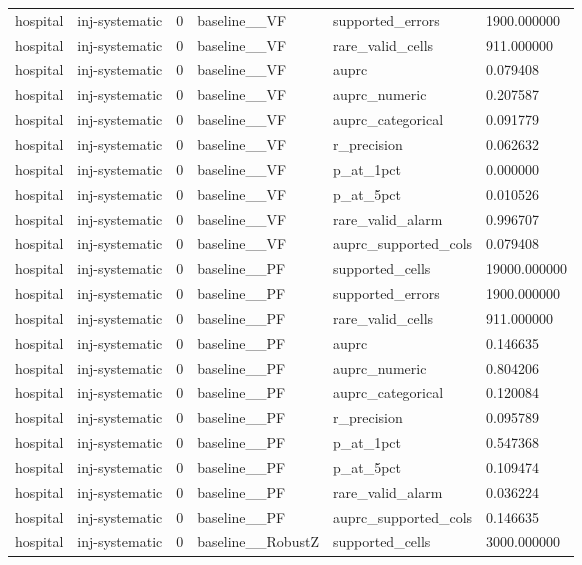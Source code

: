 \begin{tabular}{llllll}
hospital & inj-systematic & 0 & baseline\_\_VF & supported\_errors & 1900.000000 \\
hospital & inj-systematic & 0 & baseline\_\_VF & rare\_valid\_cells & 911.000000 \\
hospital & inj-systematic & 0 & baseline\_\_VF & auprc & 0.079408 \\
hospital & inj-systematic & 0 & baseline\_\_VF & auprc\_numeric & 0.207587 \\
hospital & inj-systematic & 0 & baseline\_\_VF & auprc\_categorical & 0.091779 \\
hospital & inj-systematic & 0 & baseline\_\_VF & r\_precision & 0.062632 \\
hospital & inj-systematic & 0 & baseline\_\_VF & p\_at\_1pct & 0.000000 \\
hospital & inj-systematic & 0 & baseline\_\_VF & p\_at\_5pct & 0.010526 \\
hospital & inj-systematic & 0 & baseline\_\_VF & rare\_valid\_alarm & 0.996707 \\
hospital & inj-systematic & 0 & baseline\_\_VF & auprc\_supported\_cols & 0.079408 \\
hospital & inj-systematic & 0 & baseline\_\_PF & supported\_cells & 19000.000000 \\
hospital & inj-systematic & 0 & baseline\_\_PF & supported\_errors & 1900.000000 \\
hospital & inj-systematic & 0 & baseline\_\_PF & rare\_valid\_cells & 911.000000 \\
hospital & inj-systematic & 0 & baseline\_\_PF & auprc & 0.146635 \\
hospital & inj-systematic & 0 & baseline\_\_PF & auprc\_numeric & 0.804206 \\
hospital & inj-systematic & 0 & baseline\_\_PF & auprc\_categorical & 0.120084 \\
hospital & inj-systematic & 0 & baseline\_\_PF & r\_precision & 0.095789 \\
hospital & inj-systematic & 0 & baseline\_\_PF & p\_at\_1pct & 0.547368 \\
hospital & inj-systematic & 0 & baseline\_\_PF & p\_at\_5pct & 0.109474 \\
hospital & inj-systematic & 0 & baseline\_\_PF & rare\_valid\_alarm & 0.036224 \\
hospital & inj-systematic & 0 & baseline\_\_PF & auprc\_supported\_cols & 0.146635 \\
hospital & inj-systematic & 0 & baseline\_\_RobustZ & supported\_cells & 3000.000000 \\

\end{tabular}

